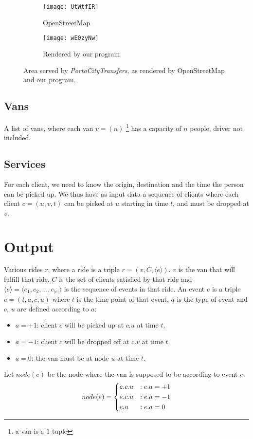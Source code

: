 \begin{figure}[H]
    \centering
    \begin{subfigure}{.45\textwidth}
        \centering
        \texttt{[image: UtWtfIR]}
        \caption{OpenStreetMap}
    \end{subfigure}
    \begin{subfigure}{.54\textwidth}
        \centering
        \texttt{[image: wE0zyNw]}
        \caption{Rendered by our program}
    \end{subfigure}
    \caption{Area served by \emph{PortoCityTransfers}, as rendered by OpenStreetMap and our program.}
\end{figure}

\subsection{Vans} \label{problem-formalization-input-vans}
A list of vans, where each van $v=(n)$ \footnote{a van is a 1-tuple} has a capacity of $n$ people, driver not included.
\subsection{Services} \label{problem-formalization-input-services}
For each client, we need to know the origin, destination and the time the person can be picked up.
We thus have as input data a sequence of clients where each client $c=(u, v, t)$ can be picked at $u$ starting in time $t$, and must be dropped at $v$.
\section{Output} \label{problem-formalization-output}
Various rides $r$, where a ride is a triple $r=(v, C, \langle e \rangle)$. $v$ is the van that will fulfill that ride, $C$ is the set of clients satisfied by that ride and $\langle e \rangle = \langle e_1, e_2,...,e_{|e|} \rangle$ is the sequence of events in that ride. An event $e$ is a triple $e=(t, a, c, u)$ where $t$ is the time point of that event, $a$ is the type of event and $c$, $u$ are defined according to $a$:
\pagebreak
\begin{itemize}
    \item $a=+1$: client $c$ will be picked up at $c.u$ at time $t$.
    \item $a=-1$: client $c$ will be dropped off at $c.v$ at time $t$.
    \item $a=0$: the van must be at node $u$ at time $t$.
\end{itemize}
Let $node(e)$ be the node where the van is supposed to be according to event $e$:
\begin{equation*}
    node(e)=\begin{dcases}
        e.c.u & : e.a = +1\\
        e.c.u & : e.a = -1\\
        e.u   & : e.a = 0
    \end{dcases}
\end{equation*}
